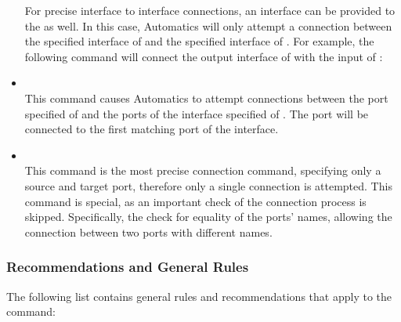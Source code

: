 \begin{itemize}
For precise interface to interface connections, an interface can be provided to the  as well.
In this case, Automatics will only attempt a connection between the specified interface of  and the specified interface of .
For example, the following command will connect the output interface of  with the input of :\\
\item {}\\
This command causes Automatics to attempt connections between the port specified of  and the ports of the interface specified of .
The port will be connected to the first matching port of the interface.
\item {}\\
This command is the most precise connection command, specifying only a source and target port, therefore only a single connection is attempted.
This command is special, as an important check of the connection process is skipped.
Specifically, the check for equality of the ports' names, allowing the connection between two ports with different names. 
\end{itemize}

\subsubsection{Recommendations and General Rules}

The following list contains general rules and recommendations that apply to the  command:

